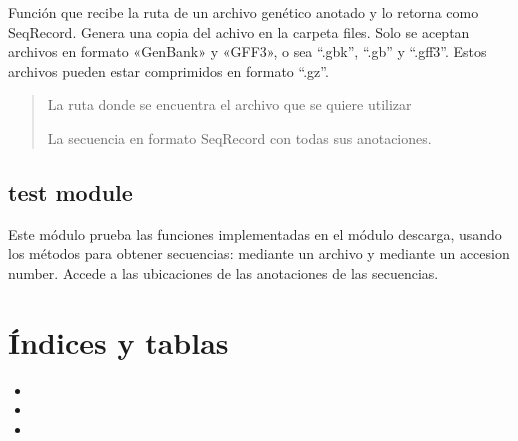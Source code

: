\documentclass[letterpaper,10pt,spanish]{sphinxmanual}
\begin{document}

\begin{fulllineitems}
\label{\detokenize{descarga:descarga.parse_file_to_seqrecord}}
\pysigstartsignatures
{}
\pysigstopsignatures
\sphinxAtStartPar
Función que recibe la ruta de un archivo genético anotado y lo retorna como SeqRecord. Genera una copia
del achivo en la carpeta files. Solo se aceptan archivos en formato «GenBank» y «GFF3», o sea “.gbk”,
“.gb” y “.gff3”. Estos archivos pueden estar comprimidos en formato “.gz”.
\begin{quote}\begin{description}
\sphinxAtStartPar
{} \textendash{} La ruta donde se encuentra el archivo que se quiere utilizar

\sphinxAtStartPar
La secuencia en formato SeqRecord con todas sus anotaciones.

\end{description}\end{quote}

\end{fulllineitems}


\sphinxstepscope


\section{test module}
\label{\detokenize{test:test-module}}\label{\detokenize{test::doc}}
\sphinxAtStartPar
Este módulo prueba las funciones implementadas en el módulo descarga, usando los métodos para obtener secuencias: mediante un archivo y mediante un accesion number. Accede a las ubicaciones de las anotaciones de las secuencias.

\label{\detokenize{test:module-test}}

\chapter{Índices y tablas}
\label{\detokenize{index:indices-y-tablas}}\begin{itemize}
\item {} 
\sphinxAtStartPar
{}

\item {} 
\sphinxAtStartPar
{}

\item {} 
\sphinxAtStartPar
{}

\end{itemize}
\end{document}
